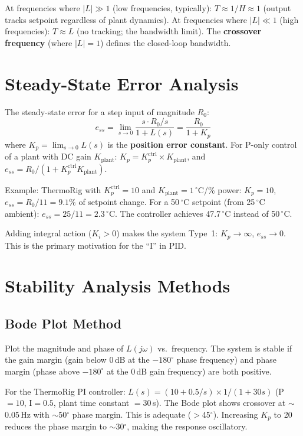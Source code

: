\documentclass[11pt,letterpaper,twoside,openany]{book}
\newcommand{\degC}{\ensuremath{{}^{\circ}\text{C}}}
\begin{document}
At frequencies where $|L| \gg 1$ (low frequencies, typically): $T \approx 1/H \approx 1$ (output tracks setpoint regardless of plant dynamics). At frequencies where $|L| \ll 1$ (high frequencies): $T \approx L$ (no tracking; the bandwidth limit). The \textbf{crossover frequency} (where $|L| = 1$) defines the closed-loop bandwidth.

\section{Steady-State Error Analysis}
The steady-state error for a step input of magnitude $R_0$:
\begin{equation}
e_{ss} = \lim_{s \to 0} \frac{s \cdot R_0/s}{1 + L(s)} = \frac{R_0}{1 + K_p}
\end{equation}
where $K_p = \lim_{s \to 0} L(s)$ is the \textbf{position error constant}. For P-only control of a plant with DC gain $K_{\text{plant}}$: $K_p = K_p^{\text{ctrl}} \times K_{\text{plant}}$, and $e_{ss} = R_0/(1 + K_p^{\text{ctrl}} K_{\text{plant}})$.

Example: ThermoRig with $K_p^{\text{ctrl}} = 10$ and $K_{\text{plant}} = 1$\,\degC{}/\% power: $K_p = 10$, $e_{ss} = R_0/11 = 9.1\%$ of setpoint change. For a 50\,\degC{} setpoint (from 25\,\degC{} ambient): $e_{ss} = 25/11 = 2.3$\,\degC{}. The controller achieves 47.7\,\degC{} instead of 50\,\degC{}.

Adding integral action ($K_i > 0$) makes the system Type~1: $K_p \to \infty$, $e_{ss} \to 0$. This is the primary motivation for the ``I'' in PID.

\section{Stability Analysis Methods}
\subsection{Bode Plot Method}
Plot the magnitude and phase of $L(j\omega)$ vs.\ frequency. The system is stable if the gain margin (gain below 0\,dB at the $-180^\circ$ phase frequency) and phase margin (phase above $-180^\circ$ at the 0\,dB gain frequency) are both positive.

For the ThermoRig PI controller: $L(s) = (10 + 0.5/s) \times 1/(1+30s)$ (P$=10$, I$=0.5$, plant time constant $= 30$\,s). The Bode plot shows crossover at $\sim$0.05\,Hz with $\sim$50$^\circ$ phase margin. This is adequate ($>$45$^\circ$). Increasing $K_p$ to 20 reduces the phase margin to $\sim$30$^\circ$, making the response oscillatory.
\end{document}
